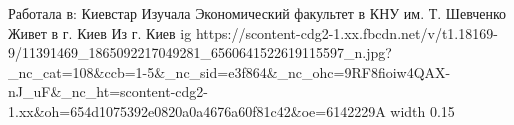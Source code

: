  
 
 
 
 

\par
Работала в: Киевстар
Изучала Экономический факультет в КНУ им. Т. Шевченко
Живет в г. Киев
Из г. Киев
\ifcmt
  ig https://scontent-cdg2-1.xx.fbcdn.net/v/t1.18169-9/11391469_1865092217049281_6560641522619115597_n.jpg?_nc_cat=108&ccb=1-5&_nc_sid=e3f864&_nc_ohc=9RF8fioiw4QAX-nJ_uF&_nc_ht=scontent-cdg2-1.xx&oh=654d1075392e0820a0a4676a60f81c42&oe=6142229A
  width 0.15
\fi
